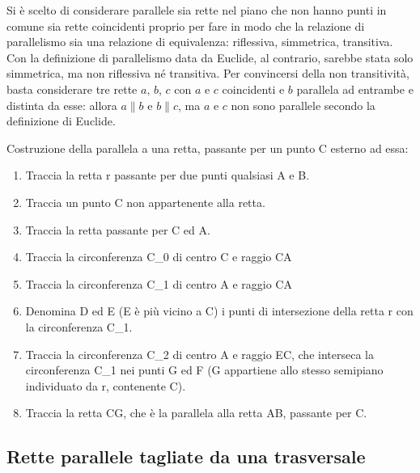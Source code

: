 Si è scelto di considerare 
parallele sia rette nel piano che non hanno punti in comune sia rette 
coincidenti proprio per fare in modo che la relazione di parallelismo 
sia una relazione di equivalenza: riflessiva, simmetrica, transitiva. 
Con la definizione di parallelismo data da Euclide, al contrario, 
sarebbe stata solo simmetrica, ma non riflessiva né transitiva. Per 
convincersi della non transitività, basta considerare tre rette \(a\), 
\(b\), \(c\) con \(a\) e \(c\) coincidenti e \(b\) parallela ad entrambe e 
distinta da esse: allora \(a\parallel b\) e \(b \parallel c\), ma \(a\) e 
\(c\) non sono parallele secondo la definizione di Euclide.

\begin{procedura}
  Costruzione della parallela a una retta, passante per un punto C esterno ad 
essa:
  \begin{enumerate} [nosep]
    \item 
    Traccia la retta r  passante per due punti qualsiasi A e B.
    \item 
    Traccia un punto C non appartenente alla retta.
    \item 
    Traccia la retta passante per C ed A. 
    \item 
    Traccia la circonferenza C\_0 di centro C e raggio CA  
    \item       
    Traccia la circonferenza C\_1 di centro A e raggio CA
    \item   
    Denomina D ed E (E è più vicino a C) i punti di intersezione della retta r 
con la circonferenza C\_1.  
    \item 
    Traccia la circonferenza C\_2 di centro A e raggio EC, che 
interseca la circonferenza C\_1 nei punti G ed F (G appartiene allo stesso 
semipiano individuato da r, contenente C).
    \item
    Traccia la retta CG, che è la parallela alla retta AB, passante per C.
  \end{enumerate}
\end{procedura}

\subsection{Rette parallele tagliate da una trasversale}

